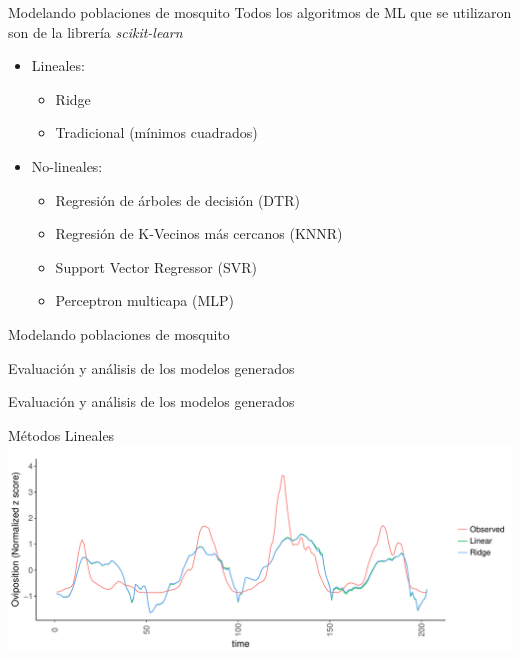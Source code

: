 \documentclass[10pt]{beamer}
\begin{document}
\begin{frame}{Modelando poblaciones de mosquito}
  Todos los algoritmos de ML que se utilizaron son de la librería \textit{scikit-learn}
  \begin{itemize}
    \item Lineales:
      \begin{itemize}
        \item Ridge
        \item Tradicional (mínimos cuadrados)
      \end{itemize}
    \item No-lineales:
      \begin{itemize}
        \item Regresión de árboles de decisión (DTR)
        \item Regresión de K-Vecinos más cercanos (KNNR)
        \item Support Vector Regressor (SVR)
        \item Perceptron multicapa (MLP)
      \end{itemize}
  \end{itemize}
\end{frame}



\begin{frame}{Modelando poblaciones de mosquito}
  \begin{center}
    Evaluación y análisis de los modelos generados
  \end{center}
\end{frame}


\begin{frame}{Evaluación y análisis de los modelos generados}
  \begin{center}
    Métodos Lineales
    \includegraphics[width=1\textwidth]{RidgeVsTime}
  \end{center}
\end{frame}
\end{document}
